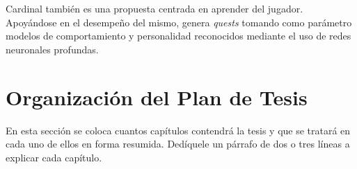 Cardinal también es una propuesta centrada en aprender del jugador. Apoyándose en el desempeño del mismo, genera  \textit{quests} tomando como parámetro modelos de comportamiento y personalidad reconocidos mediante el uso de redes neuronales profundas.



\section{Organización del Plan de  Tesis}

En esta sección se coloca cuantos capítulos contendrá la tesis y que se tratará en cada uno de
ellos en forma resumida. Dedíquele un párrafo de dos o tres líneas a explicar cada capítulo.

